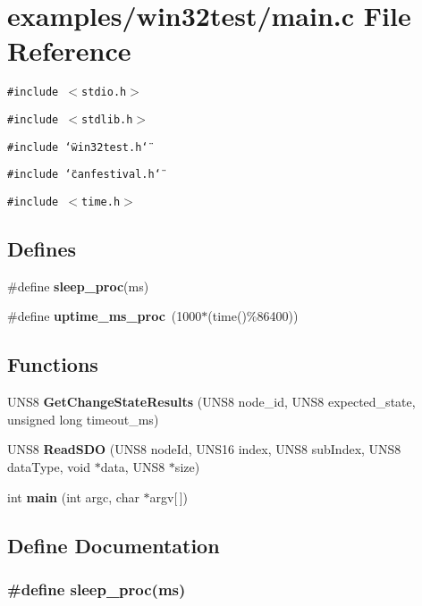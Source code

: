 \section{examples/win32test/main.c File Reference}
\label{main_8c}
{\tt \#include $<$stdio.h$>$}\par
{\tt \#include $<$stdlib.h$>$}\par
{\tt \#include \char`\"{}win32test.h\char`\"{}}\par
{\tt \#include \char`\"{}canfestival.h\char`\"{}}\par
{\tt \#include $<$time.h$>$}\par
\subsection*{Defines}
\begin{CompactItemize}
\item 
\#define {\bf sleep\_\-proc}(ms)
\item 
\#define {\bf uptime\_\-ms\_\-proc}~(1000$\ast$(time()\%86400))
\end{CompactItemize}
\subsection*{Functions}
\begin{CompactItemize}
\item 
UNS8 {\bf Get\-Change\-State\-Results} (UNS8 node\_\-id, UNS8 expected\_\-state, unsigned long timeout\_\-ms)
\item 
UNS8 {\bf Read\-SDO} (UNS8 node\-Id, UNS16 index, UNS8 sub\-Index, UNS8 data\-Type, void $\ast$data, UNS8 $\ast$size)
\item 
int {\bf main} (int argc, char $\ast$argv[$\,$])
\end{CompactItemize}


\subsection{Define Documentation}
\subsubsection{\setlength{\rightskip}{0pt plus 5cm}\#define sleep\_\-proc(ms)}\label{main_8c_912c62bad87e954cee4b1733111a420b}


